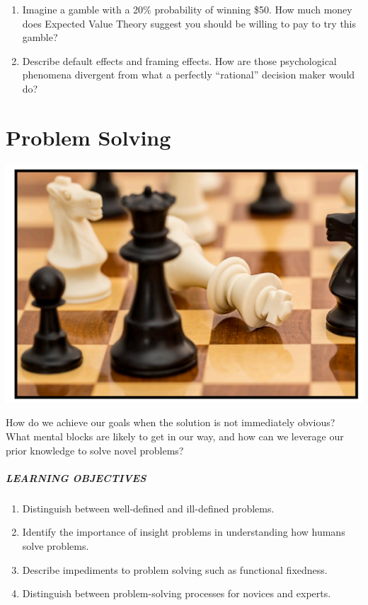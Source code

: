\documentclass[
]{krantz}
\providecommand{\tightlist}{%
  \setlength{\itemsep}{0pt}\setlength{\parskip}{0pt}}
\begin{document}
\begin{enumerate}
\def\labelenumi{\arabic{enumi}.}
\tightlist
\item
  Imagine a gamble with a 20\% probability of winning \$50. How much money does Expected Value Theory suggest you should be willing to pay to try this gamble?
\item
  Describe default effects and framing effects. How are those psychological phenomena divergent from what a perfectly ``rational'' decision maker would do?
\end{enumerate}

\chapter{Problem Solving}\label{problem-solving}

\begin{center}\includegraphics[width=1\linewidth]{images/ch10/cover} \end{center}

How do we achieve our goals when the solution is not immediately obvious? What mental blocks are likely to get in our way, and how can we leverage our prior knowledge to solve novel problems?

\paragraph*{LEARNING OBJECTIVES}\label{learning-objectives-9}

\begin{enumerate}
\def\labelenumi{\arabic{enumi}.}
\tightlist
\item
  Distinguish between well-defined and ill-defined problems.
\item
  Identify the importance of insight problems in understanding how humans solve problems.
\item
  Describe impediments to problem solving such as functional fixedness.
\item
  Distinguish between problem-solving processes for novices and experts.
\end{enumerate}
\end{document}

